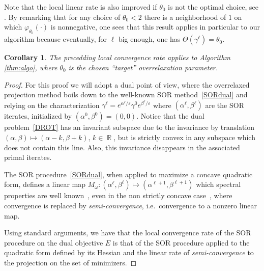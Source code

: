 \documentclass{article} %
\DeclareMathOperator{\IR}{\mathbb{R}}
\renewcommand{\epsilon}{\varepsilon}
\theoremstyle{plain}
\newtheorem{corollary}{Corollary}
\theoremstyle{definition}
\theoremstyle{remark}
\begin{document}
Note that the local linear rate is also improved if $\theta_0$ is not the optimal choice, see \cite[chapter 5]{ciarlet1982introduction}. By remarking that for any choice of $\theta_0<2$ there is a neighborhood of $1$ on which $\varphi_{\theta_0}(\cdot)$ is nonnegative, one sees that this result applies in particular to our algorithm because eventually, for $\ell$ big enough, one has $\Theta(\gamma^\ell)=\theta_0$.
\begin{corollary}
The precedding local convergence rate applies to Algorithm \ref{thm:algo}, where $\theta_0$ is the chosen ``target'' overrelaxation parameter.
\end{corollary}

\begin{proof}
For this proof we will adopt a dual point of view, where the overrelaxed projection method boils down to the well-known SOR method~\eqref{SORdual} and relying on the characterization $\gamma^{\ell}=e^{\alpha^\ell/\epsilon}\gamma^0e^{\beta^\ell/\epsilon}$ where $(\alpha^\ell,\beta^\ell)$ are the SOR iterates, initialized by $(\alpha^0,\beta^0)=(0,0)$. Notice that the dual problem~\eqref{DROT} has an invariant subspace due to the invariance by translation $(\alpha,\beta)\mapsto (\alpha-k,\beta+k)$, $k\in \IR$, but is strictly convex in any subspace which does not contain this line. Also, this invariance disappears in the associated primal iterates. 

The SOR procedure~\eqref{SORdual}, when applied to maximize a concave quadratic form, defines a linear map $M_\omega : (\alpha^{\ell},\beta^{\ell})\mapsto (\alpha^{\ell+1},\beta^{\ell+1})$ which spectral properties are well known~\cite{ciarlet1982introduction, young2014iterative}, even in the non strictly concave case~\cite{hadjidimos1985optimization}, where convergence is replaced by \emph{semi-convergence}, i.e.\ convergence to a nonzero linear map.

Using standard arguments, we have that the local convergence rate of the SOR procedure on the dual objective $E$ is that of the SOR procedure applied to the quadratic form defined by its Hessian and the linear rate of \emph{semi-convergence} to the projection on the set of minimizers. 
\end{proof}

\end{document}
